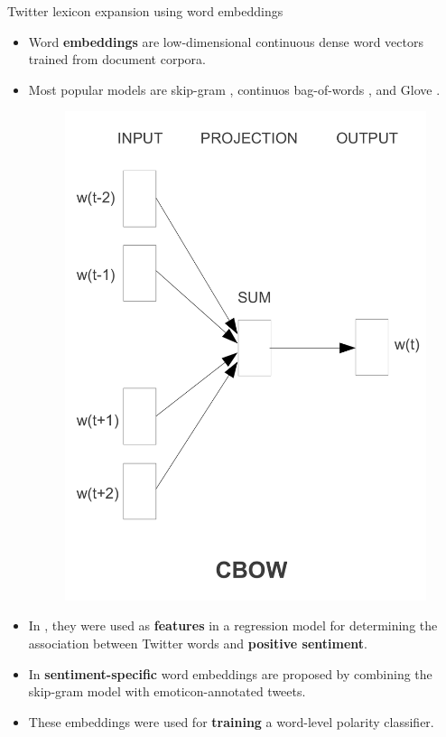 \documentclass[handout]{beamer}
\begin{document}
\begin{frame}{Twitter lexicon expansion using word embeddings}
\begin{scriptsize}
\begin{itemize}

\item  Word \textbf{embeddings} are low-dimensional continuous dense word vectors trained from document corpora.

\item Most popular models are skip-gram \cite{Mikolov2013}, continuos bag-of-words \cite{Mikolov2013}, and Glove \cite{penningtonSM14}.

  \begin{figure}[h]
        	\includegraphics[scale = 0.45]{pics/cbow.png}
        \end{figure}



\item In \cite{amir2015SemEval}, they were used as \textbf{features} in a regression model for determining the association between Twitter words and \textbf{positive sentiment}. 

\item In \cite{TangCol14}  \textbf{sentiment-specific} word embeddings are proposed  by combining the skip-gram model with emoticon-annotated tweets.
\item These embeddings were used for \textbf{training} a word-level polarity classifier.
\end{itemize}
\end{scriptsize}
\end{frame}
\end{document}
